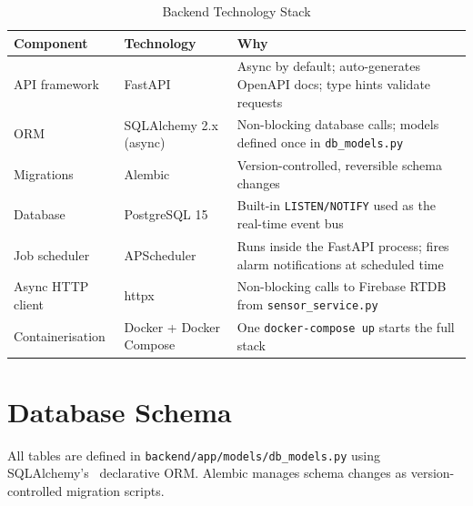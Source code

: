 \documentclass[12pt,a4paper]{report}
\begin{document}
\begin{table}[H]
\centering
\caption{Backend Technology Stack}
\label{tab:backend_stack}
\begin{tabularx}{\textwidth}{@{}lXX@{}}
\toprule
\textbf{Component}  & \textbf{Technology}     & \textbf{Why} \\
\midrule
API framework       & FastAPI                 & Async by default; auto-generates OpenAPI docs; type hints validate requests \\
ORM                 & SQLAlchemy 2.x (async)  & Non-blocking database calls; models defined once in \texttt{db\_models.py} \\
Migrations          & Alembic                 & Version-controlled, reversible schema changes \\
Database            & PostgreSQL 15           & Built-in \texttt{LISTEN/NOTIFY} used as the real-time event bus \\
Job scheduler       & APScheduler             & Runs inside the FastAPI process; fires alarm notifications at scheduled time \\
Async HTTP client   & httpx                   & Non-blocking calls to Firebase RTDB from \texttt{sensor\_service.py} \\
Containerisation    & Docker + Docker Compose & One \texttt{docker-compose up} starts the full stack \\
\bottomrule
\end{tabularx}
\end{table}

\newpage
\section{Database Schema}

All tables are defined in \texttt{backend/app/models/db\_models.py} using SQLAlchemy's~\cite{sqlalchemy} declarative ORM. Alembic manages schema changes as version-controlled migration scripts.
\end{document}
